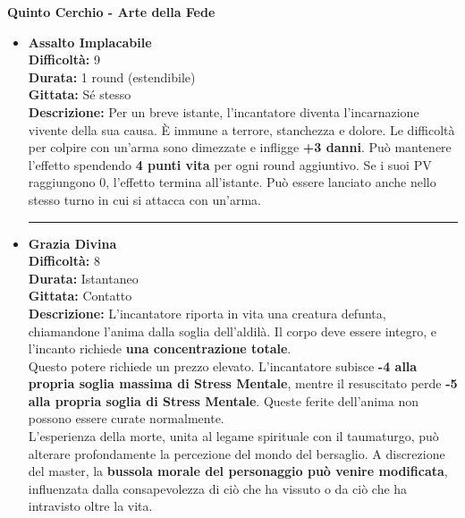\documentclass[../manuale_main.tex]{subfiles}
\begin{document}
\vspace{0.5cm}
{\zarafirtitlefont\Large\bfseries Quinto Cerchio - Arte della Fede}

\begin{itemize}

\item \textbf{Assalto Implacabile} \\
\textbf{Difficoltà:} 9 \\
\textbf{Durata:} 1 round (estendibile) \\
\textbf{Gittata:} Sé stesso \\
\textbf{Descrizione:} Per un breve istante, l’incantatore diventa l’incarnazione vivente della sua causa. È immune a terrore, stanchezza e dolore. Le difficoltà per colpire con un’arma sono dimezzate e infligge \textbf{+3 danni}. Può mantenere l'effetto spendendo \textbf{4 punti vita} per ogni round aggiuntivo. Se i suoi PV raggiungono 0, l’effetto termina all’istante. Può essere lanciato anche nello stesso turno in cui si attacca con un'arma.

\vspace{0.5cm}\rule{\textwidth}{0.4pt}\vspace{1cm}

\item \textbf{Grazia Divina} \\
\textbf{Difficoltà:} 8 \\
\textbf{Durata:} Istantaneo \\
\textbf{Gittata:} Contatto \\
\textbf{Descrizione:} L'incantatore riporta in vita una creatura defunta, chiamandone l’anima dalla soglia dell’aldilà. Il corpo deve essere integro, e l’incanto richiede \textbf{una concentrazione totale}.\\

Questo potere richiede un prezzo elevato. L'incantatore subisce \textbf{-4 alla propria soglia massima di Stress Mentale}, mentre il resuscitato perde \textbf{-5 alla propria soglia di Stress Mentale}. Queste ferite dell’anima non possono essere curate normalmente.\\

L’esperienza della morte, unita al legame spirituale con il taumaturgo, può alterare profondamente la percezione del mondo del bersaglio. A discrezione del master, la \textbf{bussola morale del personaggio può venire modificata}, influenzata dalla consapevolezza di ciò che ha vissuto o da ciò che ha intravisto oltre la vita.\\


\end{itemize}
\end{document}
